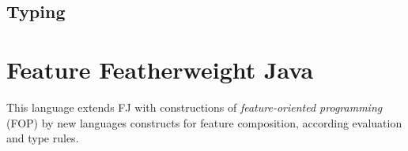 \subsection{Typing}

\section{Feature Featherweight Java}

This language extends FJ with constructions of \textit{feature-oriented
programming} (FOP) by new languages constructs for feature composition,
according evaluation and type rules.



